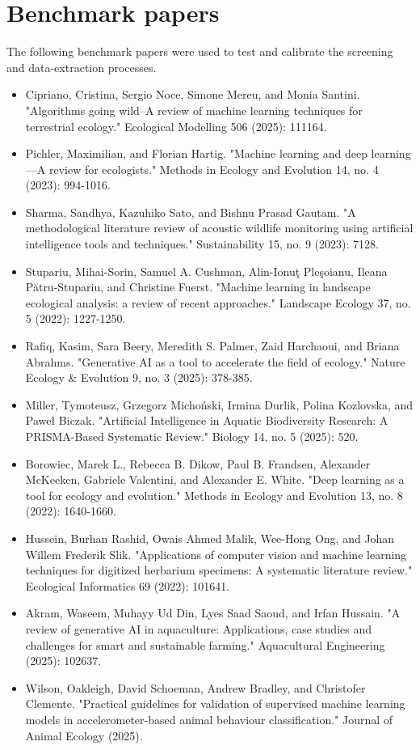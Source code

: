 \documentclass{article}
\newcommand{\bei}{\begin{itemize}}
\newcommand{\eei}{\end{itemize}}
\begin{document}
\section{Benchmark papers}
The following benchmark papers were used to test and calibrate the screening and data-extraction processes.
\bei
\item Cipriano, Cristina, Sergio Noce, Simone Mereu, and Monia Santini. "Algorithms going wild–A review of machine learning techniques for terrestrial ecology." Ecological Modelling 506 (2025): 111164.
\item Pichler, Maximilian, and Florian Hartig. "Machine learning and deep learning—A review for ecologists." Methods in Ecology and Evolution 14, no. 4 (2023): 994-1016.
\item Sharma, Sandhya, Kazuhiko Sato, and Bishnu Prasad Gautam. "A methodological literature review of acoustic wildlife monitoring using artificial intelligence tools and techniques." Sustainability 15, no. 9 (2023): 7128.
\item Stupariu, Mihai-Sorin, Samuel A. Cushman, Alin-Ionuţ Pleşoianu, Ileana Pătru-Stupariu, and Christine Fuerst. "Machine learning in landscape ecological analysis: a review of recent approaches." Landscape Ecology 37, no. 5 (2022): 1227-1250.
\item Rafiq, Kasim, Sara Beery, Meredith S. Palmer, Zaid Harchaoui, and Briana Abrahms. "Generative AI as a tool to accelerate the field of ecology." Nature Ecology \& Evolution 9, no. 3 (2025): 378-385.
\item Miller, Tymoteusz, Grzegorz Michoński, Irmina Durlik, Polina Kozlovska, and Paweł Biczak. "Artificial Intelligence in Aquatic Biodiversity Research: A PRISMA-Based Systematic Review." Biology 14, no. 5 (2025): 520.
\item Borowiec, Marek L., Rebecca B. Dikow, Paul B. Frandsen, Alexander McKeeken, Gabriele Valentini, and Alexander E. White. "Deep learning as a tool for ecology and evolution." Methods in Ecology and Evolution 13, no. 8 (2022): 1640-1660.
\item Hussein, Burhan Rashid, Owais Ahmed Malik, Wee-Hong Ong, and Johan Willem Frederik Slik. "Applications of computer vision and machine learning techniques for digitized herbarium specimens: A systematic literature review." Ecological Informatics 69 (2022): 101641.
\item Akram, Waseem, Muhayy Ud Din, Lyes Saad Saoud, and Irfan Hussain. "A review of generative AI in aquaculture: Applications, case studies and challenges for smart and sustainable farming." Aquacultural Engineering (2025): 102637.
\item Wilson, Oakleigh, David Schoeman, Andrew Bradley, and Christofer Clemente. "Practical guidelines for validation of supervised machine learning models in accelerometer‐based animal behaviour classification." Journal of Animal Ecology (2025).
\eei
\end{document}
